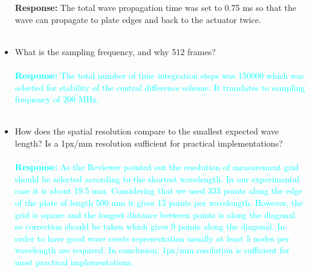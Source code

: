 \documentclass[11pt,a2paper]{report}
\begin{document}
\begin{itemize}
{			\textbf{Response:}
		The total wave propagation time was set to 0.75 ms so that the wave can propagate to plate edges and back to the actuator twice.
	    }
		\\ \\
		\item What is the sampling frequency, and why 512 frames?
			\\ \\
		\textcolor{Cyan}{
			\textbf{Response:}
		The total number of time integration steps was 150000 which was selected for stability of the central difference scheme. It translates to sampling frequency of 200 MHz.}
		\\ \\
		\item How does the spatial resolution compare to the smallest expected wave length? Is a 1px/mm resolution sufficient for practical implementations?
			\\ \\
		\textcolor{Cyan}{
			\textbf{Response:}
			As the Reviewer pointed out the resolution of measurement grid should be selected according to the shortest wavelength. In our experimental case it is about 19.5 mm. Considering that we used 333 points along the edge of the plate of length 500 mm it gives 13 points per wavelength. However, the grid is square and the longest distance between points is along the diagonal so correction should be taken which gives 9 points along the diagonal. In order to have good wave crests representation usually at least 5 nodes per wavelength are required.
			In conclusion, 1px/mm resolution is sufficient for most practical implementations.
		}
		\\ \\
	\end{itemize}
\end{document}
